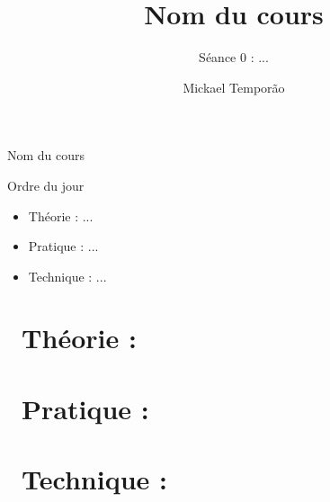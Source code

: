 \documentclass[10pt]{beamer}
\title{Nom du cours}
\subtitle{Séance 0 :  ...}
\author{Mickael Temporão}
\institute{\faEnvelope~$m.temporao@sciencespobordeaux.fr$\\\faTwitter~$@mickaeltemporao$}
\date{}
\begin{document}
\maketitle

\begin{frame}{Nom du cours}
    \begin{block}{Ordre du jour}
        \begin{itemize}
            \item[\faBook] Théorie : ...
            \item[\faFlask] Pratique : ...
            \item[\faLaptopCode] Technique : ...
        \end{itemize}
    \end{block}
\end{frame}

\section{\faBook~Théorie : }
\section{\faFlask~Pratique : }
\section{\faLaptopCode~Technique : }

\maketitle
\end{document}
